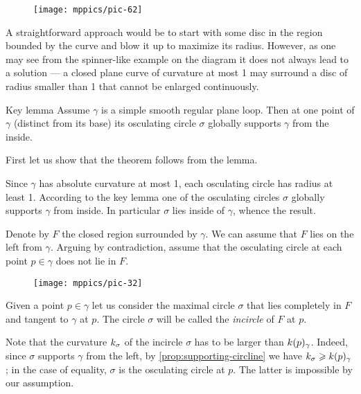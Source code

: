{

\begin{wrapfigure}{r}{33 mm}
\vskip-4mm
\centering
\texttt{[image: mppics/pic-62]}
\vskip0mm
\end{wrapfigure}

A straightforward approach would be to start with some disc in the region bounded by the curve and blow it up to maximize its radius.
However, as one may see from the spinner-like example on the diagram it does not always lead to a solution --- a closed plane curve of curvature at most 1 may surround a disc of radius smaller than 1 that cannot be enlarged continuously.

}

\begin{thm}{Key lemma}\label{thm:moon}
Assume $\gamma$ is a simple smooth regular plane loop.
Then at one point of $\gamma$ (distinct from its base) its osculating circle $\sigma$ globally supports $\gamma$ from the inside.
\end{thm}

First let us show that the theorem follows from the lemma.

Since $\gamma$ has absolute curvature at most 1, each osculating circle has radius at least 1.
According to the key lemma one of the osculating circles $\sigma$ globally supports $\gamma$ from inside.
In particular $\sigma$ lies inside of $\gamma$, whence the result.
\qeds

Denote by $F$ the closed region surrounded by $\gamma$.
We can assume that $F$ lies on the left from $\gamma$.
Arguing by contradiction,
assume that the osculating circle at each point $p\in \gamma$ does not lie in $F$.

\begin{figure}[!ht]%
\vskip-0mm
\centering
\texttt{[image: mppics/pic-32]}
\vskip0mm
\end{figure}

Given a point $p\in\gamma$ let us consider the maximal circle $\sigma$ that lies completely in $F$ and tangent to $\gamma$ at $p$.
The circle $\sigma$ will be called the {}\emph{incircle} of $F$ at $p$.

Note that the curvature $k_\sigma$ of the incircle $\sigma$ has to be larger than $k(p)_\gamma$.
Indeed, since $\sigma$ supports $\gamma$ from the left, by \ref{prop:supporting-circline} we have $k_\sigma\geqslant k(p)_\gamma$; in the case of equality, $\sigma$ is the osculating circle at $p$.
The latter is impossible by our assumption.

